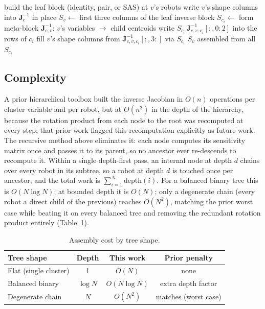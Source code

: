 \documentclass[12pt, letterpaper, oneside]{report}
\begin{document}
\begin{algorithm}[t]
\caption{Single-pass inverse Jacobian assembly}
\label{alg:assemble}
\begin{algorithmic}[1]
    \State build the leaf block (identity, pair, or SAS) at $v$'s robots
    \State write $v$'s shape columns into $\mathbf{J}_c^{-1}$ in place
    \State \Return $S_v \gets$ first three columns of the leaf inverse block
  \EndIf
    \State $S_{c_i} \gets$ 
  \EndFor
  \State form meta-block $\mathbf{J}_{c,v}^{-1}$: $v$'s variables $\to$ child centroids
    \State write $S_{c_i}\, \mathbf{J}_{c,v,c_i}^{-1}[:,0{:}2]$ into the rows of $c_i$
    \State fill $v$'s shape columns from $\mathbf{J}_{c,v,c_i}^{-1}[:,3{:}]$ via $S_{c_i}$
  \EndFor
  \State \Return $S_v$ assembled from all $S_{c_i}$
\EndFunction
\end{algorithmic}
\end{algorithm}

\subsection{Complexity}

A prior hierarchical toolbox built the inverse Jacobian in $O(n)$ operations
per cluster variable and per robot, but at $O(n^2)$ in the depth of the
hierarchy, because the rotation product from each node to the root was
recomputed at every step; that prior work flagged this recomputation
explicitly as future work. The recursive method above eliminates it: each
node computes its sensitivity matrix once and passes it to its parent, so
no ancestor ever re-descends to recompute it. Within a single depth-first
pass, an internal node at depth $d$ chains over every robot in its subtree,
so a robot at depth $d$ is touched once per ancestor, and the total work is
$\sum_{i=1}^N \text{depth}(i)$. For a balanced binary tree this is
$O(N\log N)$; at bounded depth it is $O(N)$; only a degenerate chain (every
robot a direct child of the previous) reaches $O(N^2)$, matching the prior
worst case while beating it on every balanced tree and removing the
redundant rotation product entirely (Table~\ref{tab:complexity}).

\begin{table}[t]
\centering
\caption{Assembly cost by tree shape.}
\label{tab:complexity}
\begin{tabular}{lccc}
\toprule
Tree shape & Depth & This work & Prior penalty \\
\midrule
Flat (single cluster) & 1 & $O(N)$ & none \\
Balanced binary & $\log N$ & $O(N\log N)$ & extra depth factor \\
Degenerate chain & $N$ & $O(N^2)$ & matches (worst case) \\
\bottomrule
\end{tabular}
\end{table}
\end{document}
